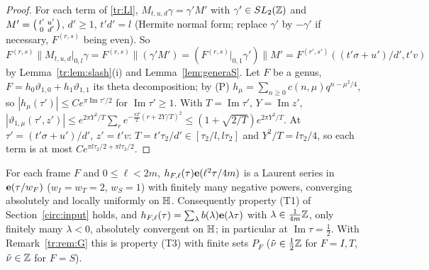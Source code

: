 \begin{proof}
For each term of \eqref{tr:Ll}, $M_{t,u,d}\gamma=\gamma'M'$ with $\gamma'\in SL_2(\mathbb{Z})$ and $M'=\begin{psmallmatrix}t'&u'\\0&d'\end{psmallmatrix}$, $d'\ge1$, $t'd'=l$ (Hermite normal form; replace $\gamma'$ by $-\gamma'$ if necessary, $F^{(r,s)}$ being even). So $F^{(r,s)}\|M_{t,u,d}|_{0,l}\gamma=F^{(r,s)}\|(\gamma'M')=(F^{(r,s)}|_{0,1}\gamma')\|M'=F^{(r',s')}((t'\sigma+u')/d',t'v)$ by Lemma~\ref{tr:lem:slash}(i) and Lemma~\ref{lem:generaS}. Let $F$ be a genus, $F=h_0\vartheta_{1,0}+h_1\vartheta_{1,1}$ its theta decomposition; by (P) $h_\mu=\sum_{n\ge0}c(n,\mu)q^{n-\mu^2/4}$, so $|h_\mu(\tau')|\le Ce^{\pi\operatorname{Im}\tau'/2}$ for $\operatorname{Im}\tau'\ge1$. With $T=\operatorname{Im}\tau'$, $Y=\operatorname{Im}z'$, $|\vartheta_{1,\mu}(\tau',z')|\le e^{2\pi Y^2/T}\sum_r e^{-\frac{\pi T}2(r+2Y/T)^2}\le(1+\sqrt{2/T})e^{2\pi Y^2/T}$. At $\tau'=(t'\sigma+u')/d'$, $z'=t'v$: $T=t'\tau_2/d'\in[\tau_2/l,l\tau_2]$ and $Y^2/T=l\tau_2/4$, so each term is at most $Ce^{\pi l\tau_2/2+\pi l\tau_2/2}$.
\end{proof}

\begin{theorem}\label{tr:thm:polar}
For each frame $F$ and $0\le\ell<2m$, $h_{F,\ell}(\tau)\mathbf e(\ell^2\tau/4m)$ is a Laurent series in $\mathbf e(\tau/w_F)$ \textup($w_I=w_T=2$, $w_S=1$\textup) with finitely many negative powers, converging absolutely and locally uniformly on $\mathbb{H}$. Consequently property \textup{(T1)} of Section~\ref{circ:input} holds, and $h_{F,\ell}(\tau)=\sum_\lambda b(\lambda)\mathbf e(\lambda\tau)$ with $\lambda\in\frac1{4m}\mathbb{Z}$, only finitely many $\lambda<0$, absolutely convergent on $\mathbb{H}$; in particular at $\operatorname{Im}\tau=\frac12$. With Remark~\ref{tr:rem:G} this is property \textup{(T3)} with finite sets $P_F$ \textup($\tilde\nu\in\frac12\mathbb{Z}$ for $F=I,T$, $\tilde\nu\in\mathbb{Z}$ for $F=S$\textup).
\end{theorem}


